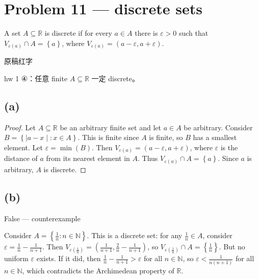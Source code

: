 \section{Problem 11 --- discrete sets}

A set \(A \subseteq \mathbb{R}\) is discrete if for every \(a \in A\) there is \(\varepsilon > 0\) such that \(V_{\varepsilon{(a)}} \cap A = \left\{ a \right\}\), where \(V_{\varepsilon{(a)}} = \left( {a - \varepsilon,a + \varepsilon} \right)\).

\begin{qlnote}{原稿红字}

hw 1 ④：任意 finite \(A \subseteq \mathbb{R}\) 一定 discrete。

\end{qlnote}

\subsection{(a)}

\begin{proof}

Let \(A \subseteq \mathbb{R}\) be an arbitrary finite set and let \(a \in A\) be arbitrary. Consider \(B = \left\{ |a - x \middle| :x \in A \right\}\). This is finite since \(A\) is finite, so \(B\) has a smallest element. Let \(\varepsilon = \min(B)\). Then \(V_{\varepsilon{(a)}} = \left( {a - \varepsilon,a + \varepsilon} \right)\), where \(\varepsilon\) is the distance of \(a\) from its nearest element in \(A\). Thus \(V_{\varepsilon{(a)}} \cap A = \left\{ a \right\}\). Since \(a\) is arbitrary, \(A\) is discrete.

\end{proof}

\subsection{(b)}

\begin{qlsolution}{False --- counterexample}

Consider \(A = \left\{ {\frac{1}{n}:n \in \mathbb{N}} \right\}\). This is a discrete set: for any \(\frac{1}{n} \in A\), consider \(\varepsilon = \frac{1}{n} - \frac{1}{n + 1}\). Then \(V_{\varepsilon{(\frac{1}{n})}} = \left( {\frac{1}{n + 1},\frac{2}{n} - \frac{1}{n + 1}} \right)\), so \(V_{\varepsilon{(\frac{1}{n})}} \cap A = \left\{ \frac{1}{n} \right\}\). But no uniform \(\varepsilon\) exists. If it did, then \(\frac{1}{n} - \frac{1}{n + 1} > \varepsilon\) for all \(n \in \mathbb{N}\), so \(\varepsilon < \frac{1}{n\left( {n + 1} \right)}\) for all \(n \in \mathbb{N}\), which contradicts the Archimedean property of \(\mathbb{R}\).

\end{qlsolution}

